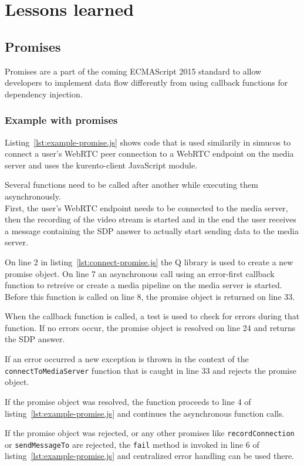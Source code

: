 \documentclass[../../../thesis.tex]{subfiles}
\begin{document}
\chapter{Lessons learned}

\section{Promises}
Promises are a part of the coming ECMAScript 2015 standard\cite{es6-promises} to allow developers to implement data flow differently from using callback functions for dependency injection.\\

\subsection{Example with promises}
Listing~\ref{lst:example-promise.js} shows code that is used similarily in simucos to connect a user's WebRTC peer connection to a WebRTC endpoint on the media server and uses the kurento-client\cite{kurento-client-doc} JavaScript module.\par

Several functions need to be called after another while executing them asynchronously. \\
First, the user's WebRTC endpoint needs to be connected to the media server, then the recording of the video stream is started and in the end the user receives a message containing the SDP answer to actually start sending data to the media server.



On line 2 in listing~\ref{lst:connect-promise.js} the Q library\cite{q-library} is used to create a new promise object. On line 7 an asynchronous call using an error-first callback function to retreive or create a media pipeline on the media server is started. Before this function is called on line 8, the promise object is returned on line 33.\par
When the callback function is called, a test is used to check for errors during that function. If no errors occur, the promise object is resolved on line 24 and returns the SDP answer. \par
If an error occurred a new exception is thrown in the context of the \texttt{connectToMediaServer} function that is caught in line 33 and rejects the promise object.\par
If the promise object was resolved, the function proceeds to line 4 of listing~\ref{lst:example-promise.js} and continues the asynchronous function calls.\par
If the promise object was rejected, or any other promises like \texttt{recordConnection} or \texttt{sendMessageTo} are rejected, the \texttt{fail} method is invoked in line 6 of listing~\ref{lst:example-promise.js} and centralized error handling can be used there.
\end{document}
